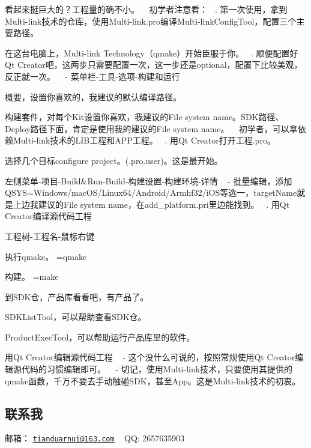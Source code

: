 看起来挺巨大的？工程量的确不小。 ~\newline
初学者注意看： ~. 第一次使用，拿到\+Multi-\/link技术的仓库，使用\+Multi-\/link.pro编译\+Multi-\/link\+Config\+Tool，配置三个主要路径。
\begin{DoxyItemize}
\item 在这台电脑上，\+Multi-\/link Technology（qmake）开始臣服于你。 ~. 顺便配置好\+Qt Creator吧，这两步只需要配置一次，这一步还是optional，配置下比较美观，反正就一次。 ~\newline
 -\/ 菜单栏-\/工具-\/选项-\/构建和运行
\begin{DoxyItemize}
\item 概要，设置你喜欢的，我建议的默认编译路径。
\item 构建套件，对每个\+Kit设置你喜欢，我建议的\+File system name。\+S\+D\+K路径、\+Deploy路径下面，肯定是使用我的建议的\+File system name。 ~\newline
 初学者，可以拿依赖\+Multi-\/link技术的\+L\+I\+B工程和\+A\+P\+P工程。 ~. 用\+Qt Creator打开工程.\+pro。
\end{DoxyItemize}
\item 选择几个目标configure project。(.pro.\+user)。这是最开始。
\item 左侧菜单-\/项目-\/\+Build\&Run-\/\+Build-\/构建设置-\/构建环境-\/详情 ~\newline
 -\/ 批量编辑，添加\+Q\+S\+YS=Windows/mac\+O\+S/\+Linux64/\+Android/\+Armhf32/i\+O\+S等选一，target\+Name就是上边我建议的\+File system name，在add\+\_\+platform.\+pri里边能找到。 ~. 用\+Qt Creator编译源代码工程
\item 工程树-\/工程名-\/鼠标右键
\begin{DoxyItemize}
\item 执行qmake。 =qmake
\item 构建。 =make
\end{DoxyItemize}
\item 到\+S\+D\+K仓，产品库看看吧，有产品了。
\begin{DoxyItemize}
\item S\+D\+K\+List\+Tool，可以帮助查看\+S\+D\+K仓。
\item Product\+Exec\+Tool，可以帮助运行产品库里的软件。
\end{DoxyItemize}
\end{DoxyItemize}

用\+Qt Creator编辑源代码工程 ~\newline
 -\/ 这个没什么可说的，按照常规使用\+Qt Creator编辑源代码的习惯编辑即可。 ~\newline
 -\/ 切记，使用\+Multi-\/link技术，只要使用其提供的qmake函数，千万不要去手动触碰\+S\+D\+K，甚至\+App。这是\+Multi-\/link技术的初衷。 ~\newline


\subsection*{联系我}

邮箱： \href{mailto:tianduarnui@163.com}{\tt tianduarnui@163.\+com} ~\newline
QQ\+: 2657635903 
